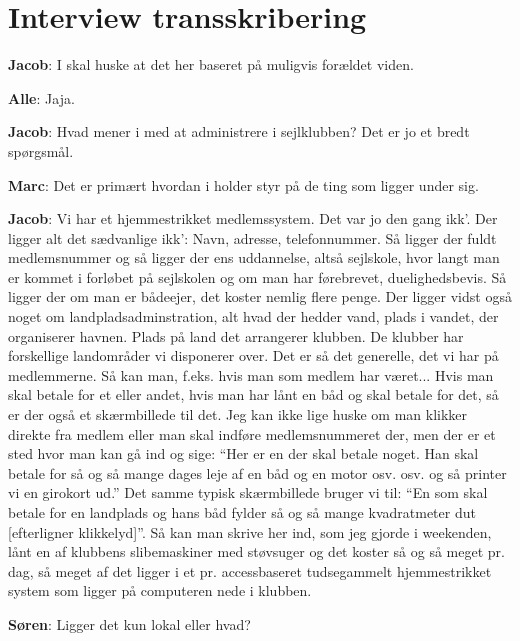\chapter{Interview transskribering}\label{bilag:interview-transkribering}
\textbf{Jacob}: I skal huske at det her baseret på muligvis forældet viden.

\textbf{Alle}: Jaja.

\textbf{Jacob}: Hvad mener i med at administrere i sejlklubben? Det er jo et bredt spørgsmål.

\textbf{Marc}: Det er primært hvordan i holder styr på de ting som ligger under sig.

\textbf{Jacob}: Vi har et hjemmestrikket medlemssystem. Det var jo den gang ikk'. Der ligger alt det sædvanlige ikk': Navn, adresse, telefonnummer. Så ligger der fuldt medlemsnummer og så ligger der ens uddannelse, altså sejlskole, hvor langt man er kommet i forløbet på sejlskolen og om man har førebrevet, duelighedsbevis. Så ligger der om man er bådeejer, det koster nemlig flere penge. Der ligger vidst også noget om landpladsadminstration, alt hvad der hedder vand, plads i vandet, der organiserer havnen. Plads på land det arrangerer klubben. De klubber har forskellige landområder vi disponerer over. Det er så det generelle, det vi har på medlemmerne.
Så kan man, f.eks. hvis man som medlem har været... Hvis man skal betale for et eller andet, hvis man har lånt en båd og skal betale for det, så er der også et skærmbillede til det. Jeg kan ikke lige huske om man klikker direkte fra medlem eller man skal indføre medlemsnummeret der, men der er et sted hvor man kan gå ind og sige: ``Her er en der skal betale noget. Han skal betale for så og så mange dages leje af en båd og en motor osv. osv. og så printer vi en girokort ud.'' Det samme typisk skærmbillede bruger vi til: ``En som skal betale for en landplads og hans båd fylder så og så mange kvadratmeter dut [efterligner klikkelyd]''. Så kan man skrive her ind, som jeg gjorde i weekenden, lånt en af klubbens slibemaskiner med støvsuger og det koster så og så meget pr. dag, så meget af det ligger i et pr. accessbaseret tudsegammelt hjemmestrikket system som ligger på computeren nede i klubben.

\textbf{Søren}: Ligger det kun lokal eller hvad?

